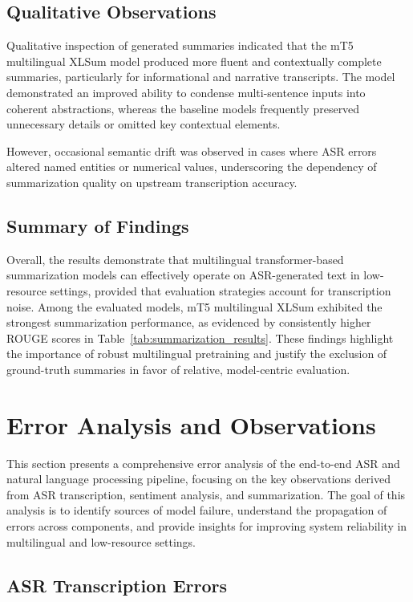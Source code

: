 \subsection{Qualitative Observations}

Qualitative inspection of generated summaries indicated that the mT5 multilingual XLSum model produced more fluent and contextually complete summaries, particularly for informational and narrative transcripts. The model demonstrated an improved ability to condense multi-sentence inputs into coherent abstractions, whereas the baseline models frequently preserved unnecessary details or omitted key contextual elements.

However, occasional semantic drift was observed in cases where ASR errors altered named entities or numerical values, underscoring the dependency of summarization quality on upstream transcription accuracy.

\subsection{Summary of Findings}

Overall, the results demonstrate that multilingual transformer-based summarization models can effectively operate on ASR-generated text in low-resource settings, provided that evaluation strategies account for transcription noise. Among the evaluated models, mT5 multilingual XLSum exhibited the strongest summarization performance, as evidenced by consistently higher ROUGE scores in Table~\ref{tab:summarization_results}. These findings highlight the importance of robust multilingual pretraining and justify the exclusion of ground-truth summaries in favor of relative, model-centric evaluation.

\section{Error Analysis and Observations}

This section presents a comprehensive error analysis of the end-to-end ASR and natural language processing pipeline, focusing on the key observations derived from ASR transcription, sentiment analysis, and summarization. The goal of this analysis is to identify sources of model failure, understand the propagation of errors across components, and provide insights for improving system reliability in multilingual and low-resource settings.

\subsection{ASR Transcription Errors}

